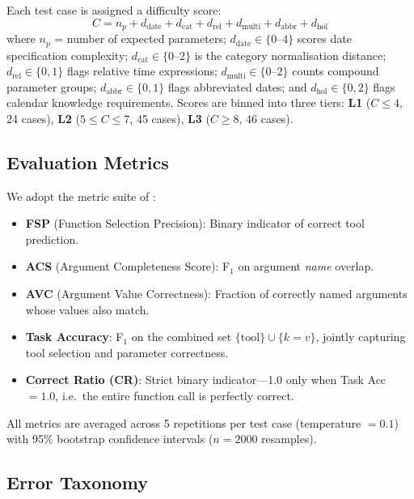 \documentclass[11pt,twocolumn]{article}
\begin{document}
Each test case is assigned a difficulty score:
\begin{equation}
C = n_p + d_{\text{date}} + d_{\text{cat}} + d_{\text{rel}} +
    d_{\text{multi}} + d_{\text{abbr}} + d_{\text{hol}}
\label{eq:complexity}
\end{equation}
where $n_p$ = number of expected parameters; $d_{\text{date}}
\in \{0\text{--}4\}$ scores date specification complexity;
$d_{\text{cat}} \in \{0\text{--}2\}$ is the category normalisation
distance; $d_{\text{rel}} \in \{0,1\}$ flags relative time
expressions; $d_{\text{multi}} \in \{0\text{--}2\}$ counts compound
parameter groups; $d_{\text{abbr}} \in \{0,1\}$ flags abbreviated
dates; and $d_{\text{hol}} \in \{0,2\}$ flags calendar knowledge
requirements.
Scores are binned into three tiers: \textbf{L1} ($C\leq4$, 24
cases), \textbf{L2} ($5\leq C\leq7$, 45 cases), \textbf{L3}
($C\geq8$, 46 cases).

\subsection{Evaluation Metrics}

We adopt the metric suite of \citet{kavathekar2025small}:

\begin{itemize}
    \item \textbf{FSP} (Function Selection Precision): Binary
          indicator of correct tool prediction.
    \item \textbf{ACS} (Argument Completeness Score): F$_1$ on
          argument \emph{name} overlap.
    \item \textbf{AVC} (Argument Value Correctness): Fraction of
          correctly named arguments whose values also match.
    \item \textbf{Task Accuracy}: F$_1$ on the combined set
          $\{\text{tool}\} \cup \{k{=}v\}$, jointly capturing tool
          selection and parameter correctness.
    \item \textbf{Correct Ratio (CR)}: Strict binary indicator---1.0
          only when Task Acc $= 1.0$, i.e.\ the entire function call
          is perfectly correct.
\end{itemize}

All metrics are averaged across 5 repetitions per test case
(temperature $= 0.1$) with 95\% bootstrap confidence intervals
\citep{efron1979bootstrap} ($n=2000$ resamples).

\subsection{Error Taxonomy}
\end{document}
